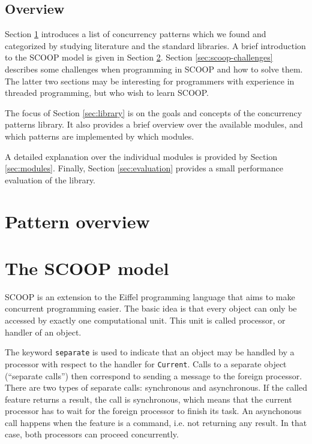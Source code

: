 \documentclass[a4paper,10pt]{article}
\newcommand{\todoref}{\todo{ref}}
\begin{document}
\subsection{Overview}

Section \ref{sec:pattern_overview} introduces a list of concurrency patterns which we found and categorized by studying literature and the standard libraries.
A brief introduction to the SCOOP model is given in Section \ref{sec:scoop-model}.
Section \ref{sec:scoop-challenges} describes some challenges when programming in SCOOP and how to solve them.
The latter two sections may be interesting for programmers with experience in threaded programming, but who wish to learn SCOOP.

The focus of Section \ref{sec:library} is on the goals and concepts of the concurrency patterns library.
It also provides a brief overview over the available modules, and which patterns are implemented by which modules.

A detailed explanation over the individual modules is provided by Section \ref{sec:modules}.
Finally, Section \ref{sec:evaluation} provides a small performance evaluation of the library.

\section {Pattern overview}
\label{sec:pattern_overview}



\section {The SCOOP model}
\label {sec:scoop-model}

SCOOP is an extension to the Eiffel programming language \todoref that aims to make concurrent programming easier.
The basic idea is that every object can only be accessed by exactly one computational unit.
This unit is called processor, or handler of an object.

The keyword \lstinline!separate! is used to indicate that an object may be handled by a processor with respect to the handler for \lstinline!Current!.
Calls to a separate object (``separate calls'') then correspond to sending a message to the foreign processor.
There are two types of separate calls: synchronous and asynchronous.
If the called feature returns a result, the call is synchronous, which means that the current processor has to wait for the foreign processor to finish its task.
An asynchonous call happens when the feature is a command, i.e. not returning any result.
In that case, both processors can proceed concurrently.
\end{document}
